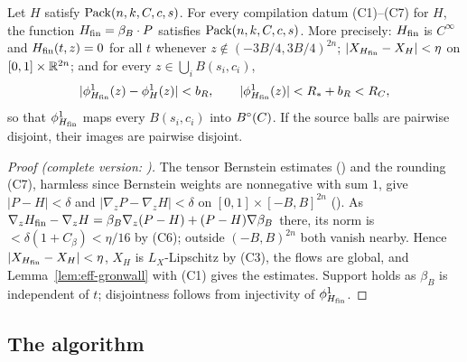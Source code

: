 \begin{theorem}\label{thm:eff-finite}
Let $H$ satisfy $\mathrm{Pack}(n,k,C,c,s)$. For every compilation datum (C1)--(C7) for $H$, the function
$H_{\mathrm{fin}}=\beta_B\cdot P$ satisfies $\mathrm{Pack}(n,k,C,c,s)$. More precisely: $H_{\mathrm{fin}}$ is $C^\infty$ and $H_{\mathrm{fin}}(t,z)=0$ for
all $t$ whenever $z\notin(-3B/4,3B/4)^{2n}$; $|X_{H_{\mathrm{fin}}}-X_H|<\eta$ on $[0,1]\times\mathbb{R}^{2n}$; and for every
$z\in\bigcup_iB(s_i,c_i)$,
\[
 |\phi^1_{H_{\mathrm{fin}}}(z)-\phi^1_H(z)|<b_R,\qquad |\phi^1_{H_{\mathrm{fin}}}(z)|<R_*+b_R<R_C,
\]
so that $\phi^1_{H_{\mathrm{fin}}}$ maps every $B(s_i,c_i)$ into $B^{\circ}(C)$. If the source balls are pairwise disjoint,
their images are pairwise disjoint.
\end{theorem}

\begin{proof}[Proof (complete version: )]
The tensor Bernstein estimates () and the rounding (C7), harmless since Bernstein weights are nonnegative with sum $1$, give $|P-H|<\delta$ and $|\nabla_zP-\nabla_zH|<\delta$ on $[0,1]\times[-B,B]^{2n}$ (). As $\nabla_zH_{\mathrm{fin}}-\nabla_zH=\beta_B\nabla_z(P-H)+(P-H)\nabla\beta_B$ there, its norm is $<\delta(1+C_\beta)<\eta/16$ by (C6); outside $(-B,B)^{2n}$ both vanish nearby. Hence $|X_{H_{\mathrm{fin}}}-X_H|<\eta$, $X_H$ is $L_X$-Lipschitz by (C3), the flows are global, and Lemma~\ref{lem:eff-gronwall} with (C1) gives the estimates. Support holds as $\beta_B$ is independent of $t$; disjointness follows from injectivity of $\phi^1_{H_{\mathrm{fin}}}$.
\end{proof}

\subsection{The algorithm}\label{sec:eff-algorithm}


